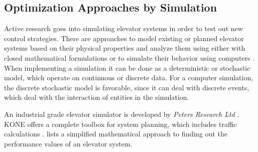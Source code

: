 \subsection{Optimization Approaches by Simulation}

Active research goes into simulating elevator systems in order to test out new control strategies.
There are approaches to model existing or planned elevator systems based on their physical properties
and analyze them using either with closed mathematical formulations or to simulate their behavior using computers \autocite[][p.~6]{beers2015arrivals}. 
When implementing a simulation it can be done as a deterministic or stochastic model, which operate on continuous or discrete data.
For a computer simulation, the discrete stochastic model is favorable, 
since it can deal with discrete events, which deal with the interaction of entities in the simulation. 

An industrial grade elevator simulator is developed by \emph{Peters Research Ltd} \autocite[][]{peters2018elevate}.
KONE offers a complete toolbox for system planning, which includes traffic calculations \autocite[][]{kone2016toolbox}.
\textcite[][p.~193]{unger2015aufzuege} lists a simplified mathematical approach to finding out the performance values of an elevator system.
